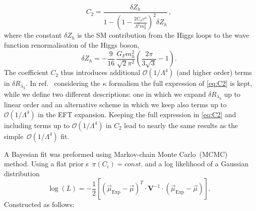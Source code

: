 \begin{equation}
	C_2=\frac{\delta Z_h}{1-\left(1-\frac{2 C_\phi v^4}{\Lambda^2 m_h^2}\right)^2 \delta Z_h}\,, \label{eq:C2}
\end{equation}
%
where the constant $\delta Z_h$ is the SM contribution from the Higgs loops to the wave function renormalisation of the Higgs boson,
\begin{equation}
	\delta Z_h =-\frac{9}{16}\,\frac{G_F m_h^2}{\sqrt{2}\pi^2}\left(\frac{2\pi}{3\sqrt{3}}-1\right).
\end{equation}
The coefficient $C_2$ thus introduces additional $\mathcal{O}(1/\Lambda^4)$ (and higher order) terms in $\delta R_{\lambda_3}$.  
In ref.~\cite{Degrassi:2016wml} considering the $\kappa$ formalism the full expression of \eqref{eq:C2} is kept, while we define two different descriptions: one in which we expand $\delta R_{\lambda_3}$ up to linear order and an alternative scheme in which we keep also terms up to $\mathcal{O}(1/\Lambda^4)$ in the EFT expansion. Keeping the full expression in \eqref{eq:C2} and including terms up to $\mathcal{O}(1/\Lambda^4)$  in $C_2$ lead to nearly the same results as the simple~$\mathcal{O}(1/\Lambda^4)$ fit.

%
A Bayesian fit was preformed using Markov-chain Monte Carlo~(MCMC) method.   Using a flat prior s~$ \pi(C_i)= const.$ and a log likelihood of a Gaussian distribution 
\begin{equation}
	\log(L) = -\frac{1}{2}\left[  (\vec{\mu}_{\mathrm{Exp}} -\vec{\mu} ) ^{T} \cdot \mathbf{V}^{-1} \cdot ( \vec{\mu}_{\mathrm{Exp}} -\vec{\mu} )\right]  .
	\label{eq:loglike}
\end{equation}
Constructed as follows:
